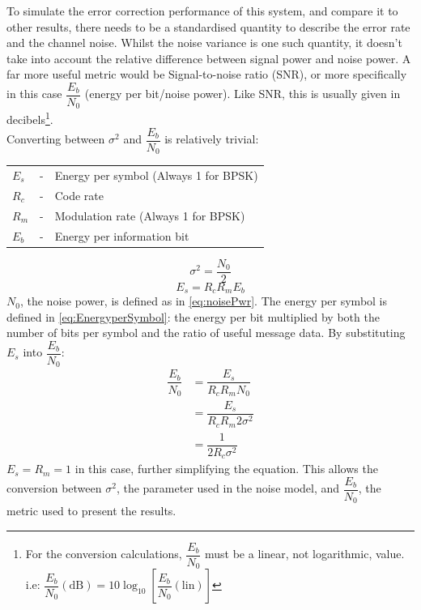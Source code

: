 \documentclass[11pt]{article}
\numberwithin{equation}{subsection}
\begin{document}
To simulate the error correction performance of this system, and compare it to other results, there needs to be a standardised quantity to describe the error rate and the channel noise. Whilst the noise variance is one such quantity, it doesn't take into account the relative difference between signal power and noise power. A far more useful metric would be Signal-to-noise ratio (SNR), or more specifically in this case $\dfrac{E_b}{N_0}$ (energy per bit/noise power). Like SNR, this is usually given in decibels\footnote{For the conversion calculations, $\dfrac{E_b}{N_0}$ must be a linear, not logarithmic, value. i.e: $\dfrac{E_b}{N_0}(\text{dB}) = 10\log_{10}\left[\dfrac{E_b}{N_0}(\text{lin})\right]$}. 
\vspace{3mm} \\
\noindent
Converting between $\sigma^2$ and $\dfrac{E_b}{N_0}$ is relatively trivial:
\vspace{3mm} \\
\noindent
\begin{tabular}{lcl}
$E_s$ & - & Energy per symbol (Always 1 for BPSK) \\
$R_c$ & - & Code rate \\
$R_m$ & - & Modulation rate (Always 1 for BPSK) \\
$E_b$ & - & Energy per information bit \\
\end{tabular}
\begin{equation} \label{eq:noisePwr}
\sigma^2 = \dfrac{N_0}{2}
\end{equation}
\begin{equation}\label{eq:EnergyperSymbol}
E_s = R_cR_mE_b
\end{equation}
$N_0$, the noise power, is defined as in \ref{eq:noisePwr}. The energy per symbol is defined in \ref{eq:EnergyperSymbol}: the energy per bit multiplied by both the number of bits per symbol and the ratio of useful message data. By substituting $E_s$ into $\dfrac{E_b}{N_0}$:
\begin{equation}
\begin{aligned}
\dfrac{E_b}{N_0} &= \dfrac{E_s}{R_cR_mN_0} \\
&= \dfrac{E_s}{R_cR_m2\sigma^2} \\
&= \dfrac{1}{2R_c\sigma^2}
\end{aligned}
\end{equation}
$E_s = R_m = 1$ in this case, further simplifying the equation. This allows the conversion between $\sigma^2$, the parameter used in the noise model, and $\dfrac{E_b}{N_0}$, the metric used to present the results.
\end{document}
